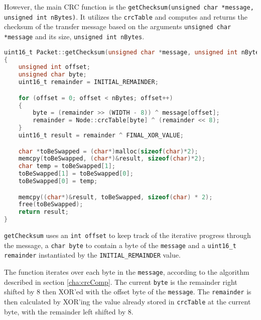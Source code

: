 However, the main CRC function is the \texttt{getChecksum(unsigned char *message, unsigned int nBytes)}. It utilizes the \texttt{crcTable} and computes and returns the checksum of the transfer message based on the arguments \texttt{unsigned char *message} and its size, \texttt{unsigned int nBytes}.

\begin{lstlisting}[language=C, caption={Determines and returns the checksum.}]
uint16_t Packet::getChecksum(unsigned char *message, unsigned int nBytes)
{
    unsigned int offset;
    unsigned char byte;
    uint16_t remainder = INITIAL_REMAINDER;

    for (offset = 0; offset < nBytes; offset++)
    {
        byte = (remainder >> (WIDTH - 8)) ^ message[offset];
        remainder = Node::crcTable[byte] ^ (remainder << 8);
    }
    uint16_t result = remainder ^ FINAL_XOR_VALUE;

    char *toBeSwapped = (char*)malloc(sizeof(char)*2);
    memcpy(toBeSwapped, (char*)&result, sizeof(char)*2);
    char temp = toBeSwapped[1];
    toBeSwapped[1] = toBeSwapped[0];
    toBeSwapped[0] = temp;

    memcpy((char*)&result, toBeSwapped, sizeof(char) * 2);
    free(toBeSwapped);
    return result;
}
\end{lstlisting}

\texttt{getChecksum} uses an \texttt{int offset} to keep track of the iterative progress through the message, a \texttt{char byte} to contain a byte of the \texttt{message} and a \texttt{uint16\_t remainder} instantiated by the \texttt{INITIAL\_REMAINDER} value. 

The function iterates over each byte in the \texttt{message}, according to the algorithm described in section \ref{cha:crcComp}. The current \texttt{byte} is the remainder right shifted by 8 then XOR'ed with the offset byte of the \texttt{message}. The \texttt{remainder} is then calculated by XOR'ing the value already stored in \texttt{crcTable} at the current byte, with the remainder left shifted by 8.
